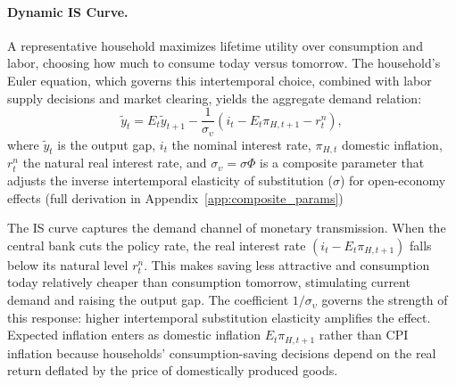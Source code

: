 \documentclass[12pt,a4paper]{article}
\begin{document}

\paragraph{Dynamic IS Curve.}
A representative household maximizes lifetime utility over consumption and labor, choosing how much to consume today versus tomorrow. The household's Euler equation, which governs this intertemporal choice, combined with labor supply decisions and market clearing, yields the aggregate demand relation:
\begin{equation}
	\tilde{y}_t = E_t\tilde{y}_{t+1} - \frac{1}{\sigma_\upsilon}(i_t - E_t\pi_{H,t+1} - r_t^n),
	\label{eq:IS_baseline}
\end{equation}
where $\tilde{y}_t$ is the output gap, $i_t$ the nominal interest rate, 
$\pi_{H,t}$ domestic inflation, $r_t^n$ the natural real interest rate, 
and $\sigma_\upsilon = \sigma\Phi$ is a composite parameter that adjusts 
the inverse intertemporal elasticity of substitution ($\sigma$) for 
open-economy effects (full derivation in Appendix~\ref{app:composite_params})

The IS curve captures the demand channel of monetary transmission. When the central bank cuts the policy rate, the real interest rate $(i_t - E_t\pi_{H,t+1})$ falls below its natural level $r_t^n$. This makes saving less attractive and consumption today relatively cheaper than consumption tomorrow, stimulating current demand and raising the output gap. The coefficient $1/\sigma_\upsilon$ governs the strength of this response: higher intertemporal substitution elasticity amplifies the effect. Expected inflation enters as domestic inflation $E_t\pi_{H,t+1}$ rather than CPI inflation because households' consumption-saving decisions depend on the real return deflated by the price of domestically produced goods.
\end{document}
